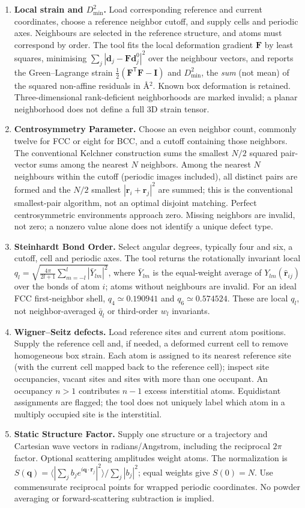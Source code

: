\begin{enumerate}
\item \textbf{Local strain and $D^2_{\min}$.} Load corresponding reference and current coordinates, choose a reference neighbor cutoff, and supply cells and periodic axes. Neighbours are selected in the reference structure, and atoms must correspond by order. The tool fits the local deformation gradient $\mathbf F$ by least squares, minimising $\sum_j|\mathbf d_j-\mathbf F\mathbf d^0_j|^2$ over the neighbour vectors, and reports the Green--Lagrange strain $\tfrac12(\mathbf F^\mathsf T\mathbf F-\mathbf I)$ and $D^2_{\min}$, the \emph{sum} (not mean) of the squared non-affine residuals in \AA$^2$. Known box deformation is retained. Three-dimensional rank-deficient neighborhoods are marked invalid; a planar neighborhood does not define a full 3D strain tensor.
\item \textbf{Centrosymmetry Parameter.} Choose an even neighbor count, commonly twelve for FCC or eight for BCC, and a cutoff containing those neighbors. The conventional Kelchner construction sums the smallest $N/2$ squared pair-vector sums among the nearest $N$ neighbors. Among the nearest $N$ neighbours within the cutoff (periodic images included), all distinct pairs are formed and the $N/2$ smallest $|\mathbf r_i+\mathbf r_j|^2$ are summed; this is the conventional smallest-pair algorithm, not an optimal disjoint matching. Perfect centrosymmetric environments approach zero. Missing neighbors are invalid, not zero; a nonzero value alone does not identify a unique defect type.
\item \textbf{Steinhardt Bond Order.} Select angular degrees, typically four and six, a cutoff, cell and periodic axes. The tool returns the rotationally invariant local $q_l=\sqrt{\tfrac{4\pi}{2l+1}\sum_{m=-l}^{l}|\bar Y_{lm}|^2}$, where $\bar Y_{lm}$ is the equal-weight average of $Y_{lm}(\hat{\mathbf r}_{ij})$ over the bonds of atom $i$; atoms without neighbours are invalid. For an ideal FCC first-neighbor shell, $q_4\simeq0.190941$ and $q_6\simeq0.574524$. These are local $q_l$, not neighbor-averaged $\bar q_l$ or third-order $w_l$ invariants.
\item \textbf{Wigner--Seitz defects.} Load reference sites and current atom positions. Supply the reference cell and, if needed, a deformed current cell to remove homogeneous box strain. Each atom is assigned to its nearest reference site (with the current cell mapped back to the reference cell); inspect site occupancies, vacant sites and sites with more than one occupant. An occupancy $n>1$ contributes $n-1$ excess interstitial atoms. Equidistant assignments are flagged; the tool does not uniquely label which atom in a multiply occupied site is the interstitial.
\item \textbf{Static Structure Factor.} Supply one structure or a trajectory and Cartesian wave vectors in radians/Angstrom, including the reciprocal $2\pi$ factor. Optional scattering amplitudes weight atoms. The normalization is $S(\mathbf q)=\langle|\sum_jb_j e^{i\mathbf q\cdot\mathbf r_j}|^2\rangle/\sum_j|b_j|^2$; equal weights give $S(0)=N$. Use commensurate reciprocal points for wrapped periodic coordinates. No powder averaging or forward-scattering subtraction is implied.
\end{enumerate}

